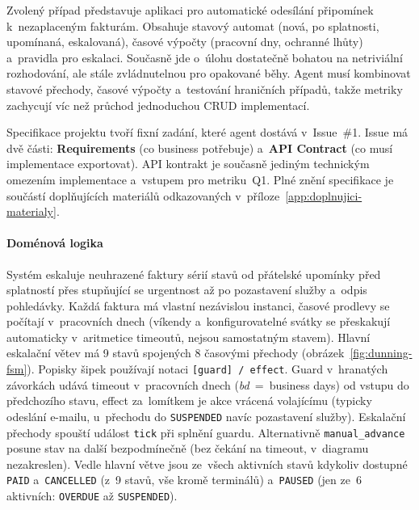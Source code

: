 Zvolený případ představuje aplikaci pro automatické odesílání
připomínek k~nezaplaceným fakturám. Obsahuje stavový
automat (nová, po splatnosti, upomínaná, eskalovaná), časové výpočty
(pracovní dny, ochranné lhůty) a~pravidla pro eskalaci. Současně
jde o~úlohu dostatečně bohatou na netriviální rozhodování, ale stále
zvládnutelnou pro opakované běhy. Agent musí kombinovat stavové
přechody, časové výpočty a~testování hraničních případů, takže
metriky zachycují víc než průchod jednoduchou CRUD implementací.

\label{sec:konstrukce-specifikace}%
Specifikace projektu tvoří fixní zadání, které agent dostává
v~Issue~\#1. Issue má dvě části: \textbf{Requirements} (co business
potřebuje) a~\textbf{API Contract} (co musí implementace exportovat).
API kontrakt je současně jediným technickým omezením implementace
a~vstupem pro metriku~\ac{Q1}.
Plné znění specifikace je součástí doplňujících materiálů
odkazovaných v~příloze~\ref{app:doplnujici-materialy}.

\paragraph{Doménová logika}
Systém eskaluje neuhrazené faktury sérií stavů od přátelské upomínky
před splatností přes stupňující se urgentnost až po pozastavení
služby a~odpis pohledávky. Každá faktura má vlastní nezávislou
instanci, časové prodlevy se počítají v~pracovních dnech (víkendy
a~konfigurovatelné svátky se přeskakují automaticky v~aritmetice
timeoutů, nejsou samostatným stavem). Hlavní eskalační větev má 9
stavů spojených 8 časovými přechody (obrázek~\ref{fig:dunning-fsm}).
Popisky šipek používají notaci \texttt{[guard]\,/\,effect}. Guard
v~hranatých závorkách udává timeout v~pracovních dnech (\textit{bd}~=~business
days) od vstupu do předchozího stavu, effect za~lomítkem je akce
vrácená volajícímu (typicky odeslání e-mailu, u~přechodu do
\texttt{SUSPENDED} navíc pozastavení služby). Eskalační přechody
spouští událost \texttt{tick} při splnění guardu. Alternativně
\texttt{manual\_advance} posune stav na další bezpodmínečně (bez čekání
na timeout, v~diagramu nezakreslen). Vedle hlavní větve jsou
ze~všech aktivních stavů kdykoliv dostupné \texttt{PAID}
a~\texttt{CANCELLED} (z~9 stavů, vše kromě terminálů) a~\texttt{PAUSED}
(jen ze~6 aktivních: \texttt{OVERDUE} až \texttt{SUSPENDED}).

